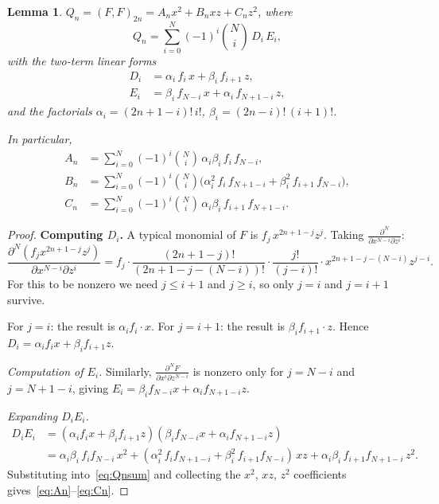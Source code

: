 \documentclass[10pt]{amsart}
\newtheorem{lemma}[theorem]{Lemma}
\theoremstyle{definition}
\theoremstyle{remark}
\begin{document}
\begin{lemma}\label{lem:Qn}
$Q_n=(F,F)_{2n}=A_n x^2+B_n xz+C_n z^2$, where
\begin{equation}\label{eq:Qnsum}
Q_n = \sum_{i=0}^{N}(-1)^i\binom{N}{i}\,D_i\,E_i,
\end{equation}
with the two-term linear forms
\begin{align}
D_i &= \alpha_i\,f_i\,x + \beta_i\,f_{i+1}\,z,\label{eq:Di}\\
E_i &= \beta_i\,f_{N-i}\,x + \alpha_i\,f_{N+1-i}\,z,\label{eq:Ei}
\end{align}
and the factorials $\alpha_i=(2n+1-i)!\,i!$, $\beta_i=(2n-i)!\,(i+1)!$.

In particular,
\begin{align}
A_n &= \sum_{i=0}^{N}(-1)^i\binom{N}{i}\,\alpha_i\beta_i\,f_i\,f_{N-i},
\label{eq:An}\\
B_n &= \sum_{i=0}^{N}(-1)^i\binom{N}{i}
\bigl(\alpha_i^2\,f_i\,f_{N+1-i}+\beta_i^2\,f_{i+1}\,f_{N-i}\bigr),
\label{eq:Bn}\\
C_n &= \sum_{i=0}^{N}(-1)^i\binom{N}{i}\,\alpha_i\beta_i\,
f_{i+1}\,f_{N+1-i}.\label{eq:Cn}
\end{align}
\end{lemma}

\begin{proof}
\textbf{Computing $D_i$.}
A typical monomial of $F$ is $f_j\,x^{2n+1-j}z^j$.
Taking $\frac{\partial^N}{\partial x^{N-i}\partial z^i}$:
\[
\frac{\partial^N (f_j x^{2n+1-j}z^j)}{\partial x^{N-i}\partial z^i}
= f_j \cdot \frac{(2n+1-j)!}{(2n+1-j-(N-i))!}\cdot\frac{j!}{(j-i)!}
\cdot x^{2n+1-j-(N-i)}z^{j-i}.
\]
For this to be nonzero we need $j \le i+1$ and $j \ge i$, so only
$j=i$ and $j=i+1$ survive.

For $j=i$: the result is $\alpha_i f_i \cdot x$.
For $j=i+1$: the result is $\beta_i f_{i+1} \cdot z$.
Hence $D_i = \alpha_i f_i x + \beta_i f_{i+1} z$.

\medskip
\emph{Computation of $E_i$.}
Similarly, $\frac{\partial^N F}{\partial x^i\partial z^{N-i}}$
is nonzero only for $j=N-i$ and $j=N+1-i$, giving
$E_i = \beta_i f_{N-i} x + \alpha_i f_{N+1-i} z$.

\medskip
\emph{Expanding $D_i E_i$.}
\begin{align*}
D_i E_i &= (\alpha_i f_i x + \beta_i f_{i+1} z)
            (\beta_i f_{N-i} x + \alpha_i f_{N+1-i} z) \\
&= \alpha_i\beta_i\,f_i f_{N-i}\,x^2
 + (\alpha_i^2\,f_i f_{N+1-i}+\beta_i^2\,f_{i+1}f_{N-i})\,xz
 + \alpha_i\beta_i\,f_{i+1}f_{N+1-i}\,z^2.
\end{align*}
Substituting into~\eqref{eq:Qnsum} and collecting the $x^2$, $xz$, $z^2$
coefficients gives~\eqref{eq:An}--\eqref{eq:Cn}.
\end{proof}
\end{document}
